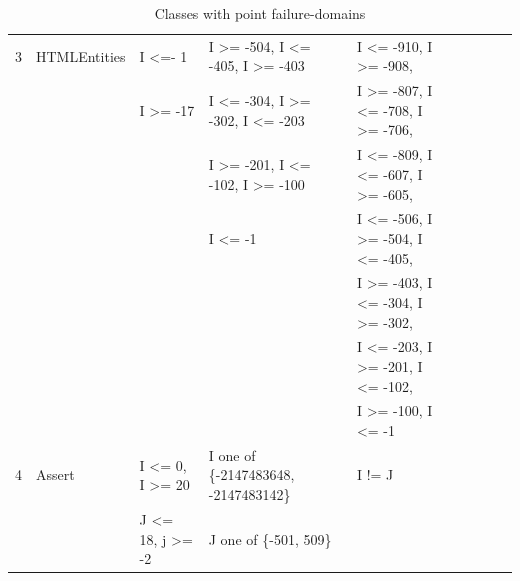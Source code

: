 \documentclass[runningheads,a4paper]{llncs}
\begin{document}
\begin{table}[h]
{{\begin{tabular}{|l|l|l|l|l|l|l|l|l|}
3	& HTMLEntities	&  	I \textless=- 1						& I \textgreater= -504, I \textless= -405, I \textgreater= -403		&  I \textless= -910, I \textgreater= -908,    									\\ 
	&                         & 	I \textgreater= -17					& I \textless= -304, I \textgreater= -302, I \textless= -203			&  I \textgreater= -807, I \textless= -708, I \textgreater= -706,  				 \\	
	&                         & 										& I \textgreater= -201, I \textless= -102, I \textgreater= -100		&  I \textless= -809, I \textless= -607, I \textgreater= -605,					 \\	
	&                         & 										& I \textless= -1													&  I \textless= -506, I \textgreater= -504, I \textless= -405,					 \\	
	&                         & 										& 																&  I \textgreater= -403, I \textless= -304, I \textgreater= -302,					 \\	
	&                         & 										& 																&  I \textless= -203, I \textgreater= -201, I \textless= -102,					  \\	
	&                         & 										& 																&  I \textgreater= -100, I \textless= -1			   		  					  \\	
4	& Assert			&	I \textless= 0, I \textgreater= 20		& I one of \{-2147483648, -2147483142\}	 						&  I != J																		  \\
	&                         & 	J \textless= 18, j \textgreater= -2		& J one of \{-501, 509\}											&  			   																  \\

\hline
\end{tabular}
}
}
\bigskip
\caption{Classes with point failure-domains}
\label{table:pointDomains}
\end{table}
\end{document}
